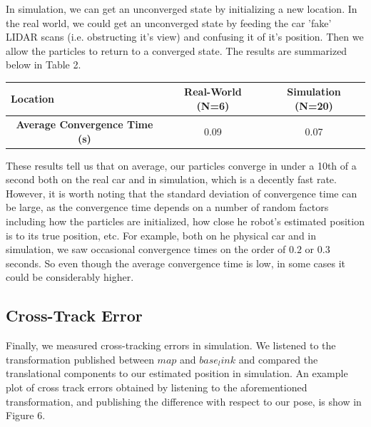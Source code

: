 \documentclass{article}
\begin{document}
In simulation, we can get an unconverged state by initializing a new location. In the real world, we could get an unconverged state by feeding the car 'fake' LIDAR scans (i.e. obstructing it's view) and confusing it of it's position. Then we allow the particles to return to a converged state. The results are summarized below in Table 2. 

\begin{center}
    \begin{tabular}{|l|c|c|}
\hline
\textbf{Location}                                           & Real-World (N=6) & Simulation (N=20) \\ \hline
\multicolumn{1}{|c|}{\textbf{Average Convergence Time (s)}} & 0.09             & 0.07              \\ \hline
\end{tabular}
\end{center}
These results tell us that on average, our particles converge in under a 10th of a second both on the real car and in simulation, which is a decently fast rate. However, it is worth noting that the standard deviation of convergence time can be large, as the convergence time depends on a number of random factors including how the particles are initialized, how close he robot's estimated position is to its true position, etc. For example, both on he physical car and in simulation, we saw occasional convergence times on the order of $0.2$ or $0.3$ seconds. So even though the average convergence time is low, in some cases it could be considerably higher.  

\subsection{Cross-Track Error}

Finally, we measured cross-tracking errors in simulation. We listened to the transformation published between $map$ and $base_link$ and compared the translational components to our estimated position in simulation. An example plot of cross track errors obtained by listening to the aforementioned transformation, and publishing the difference with respect to our pose, is show in Figure 6.   
\end{document}
